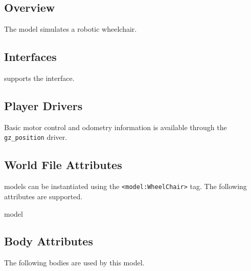 
\subsection{Overview}

The {\tt \modelName} model simulates a robotic wheelchair. 

\subsection{\libgazebo Interfaces}

{\tt \modelName} supports the  interface.


\subsection{Player Drivers}

Basic motor control and odometry information is available through the
{\tt gz\_position} driver.


\subsection{World File Attributes}

{\tt \modelName} models can be instantiated using the
\verb+<model:WheelChair>+ tag.  The following attributes are
supported.

\begin{xmlattrtable}{model}{\modelName}
\modeldefaults
\end{xmlattrtable}


\subsection{Body Attributes}

The following bodies are used by this model.

\begin{bodyattrtable}
\bodydefaults
\end{bodyattrtable}
